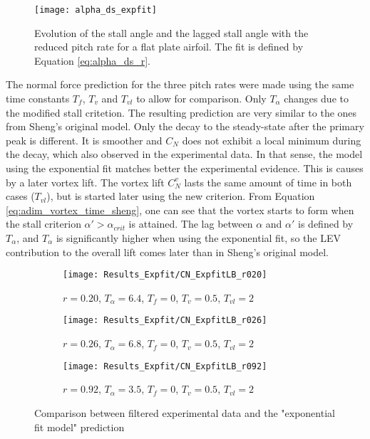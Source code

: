 \begin{figure}[h]
    \centering
    \texttt{[image: alpha\_ds\_expfit]} 
    \caption{Evolution of the stall angle and the lagged stall angle with the reduced pitch rate for a flat plate airfoil. The fit is defined by Equation \eqref{eq:alpha_ds_r}.}
    \label{fig:expfit}
\end{figure}

The normal force prediction for the three pitch rates were made using the same time constants $T_f$, $T_v$ and $T_{vl}$ to allow for comparison. Only $T_\alpha$ changes due to the modified stall critetion. The resulting prediction are very similar to the ones from Sheng's original model. Only the decay to the steady-state after the primary peak is different. It is smoother and $C_N$ does not exhibit a local minimum during the decay, which also observed in the experimental data. In that sense, the model using the exponential fit matches better the experimental evidence. This is causes by a later vortex lift. The vortex lift $C_N^v$ lasts the same amount of time in both cases ($T_{vl}$), but is started later using the new criterion. From Equation \eqref{eq:adim_vortex_time_sheng}, one can see that the vortex starts to form when the stall criterion $\alpha'>\alpha_ {crit}$ is attained. The lag between $\alpha$ and $\alpha'$ is defined by $T_\alpha$, and $T_\alpha$ is significantly higher when using the exponential fit, so the LEV contribution to the overall lift comes later than in Sheng's original model.

\begin{figure}[h]
    \begin{subfigure}{\textwidth}
        \centering
        \texttt{[image: Results\_Expfit/CN\_ExpfitLB\_r020]}
        \caption{$r=0.20$, $T_\alpha=6.4$, $T_f=0$, $T_v=0.5$, $T_{vl}=2$}
        \label{fig:CN_ExpfitLB_r020}
    \end{subfigure}
    \begin{subfigure}{\textwidth}
        \centering
        \texttt{[image: Results\_Expfit/CN\_ExpfitLB\_r026]}
        \caption{$r=0.26$, $T_\alpha=6.8$, $T_f=0$, $T_v=0.5$, $T_{vl}=2$}
        \label{fig:CN_ExpfitLB_r026}
    \end{subfigure}
    \begin{subfigure}{\textwidth}
        \centering
        \texttt{[image: Results\_Expfit/CN\_ExpfitLB\_r092]}
        \caption{$r=0.92$, $T_\alpha=3.5$, $T_f=0$, $T_v=0.5$, $T_{vl}=2$}
        \label{fig:CN_ExpfitLB_r092}
    \end{subfigure}
    \caption{Comparison between filtered experimental data and the "exponential fit model" prediction}
    \label{fig:CN_Expfit}
\end{figure}


